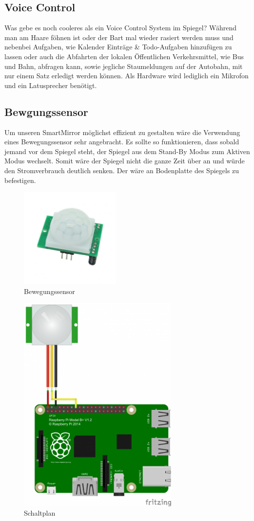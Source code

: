 \subsection{Voice Control}
Was gebe es noch cooleres als ein Voice Control System im Spiegel? Während man am Haare föhnen ist oder der Bart mal wieder rasiert werden muss und nebenbei Aufgaben, wie Kalender Einträge \& Todo-Aufgaben hinzufügen zu lassen oder auch die Abfahrten der lokalen Öffentlichen Verkehrsmittel, wie Bus und Bahn,  abfragen kann, sowie jegliche Staumeldungen auf der Autobahn, mit nur einem Satz erledigt werden können. Als Hardware wird lediglich ein Mikrofon und ein Latusprecher benötigt.

\subsection{Bewgungssensor}
Um unseren SmartMirror möglichst effizient zu gestalten wäre die Verwendung eines Bewegungssensor sehr angebracht. Es sollte so funktionieren, dass sobald jemand vor dem Spiegel steht, der Spiegel aus dem Stand-By Modus zum Aktiven Modus wechselt. Somit wäre der Spiegel nicht die ganze Zeit über an und würde den Stromverbrauch deutlich senken. Der wäre an Bodenplatte des Spiegels zu befestigen. 
\begin{figure}[h]
\includegraphics[width=50mm]{pictures/Bewegungssensor.jpg}
\caption{Bewegungssensor}
\end{figure}
\begin{figure}[h]
\includegraphics[width=80mm]{pictures/Bewegungssensor_Plan.png}
\caption{Schaltplan}
\end{figure}
